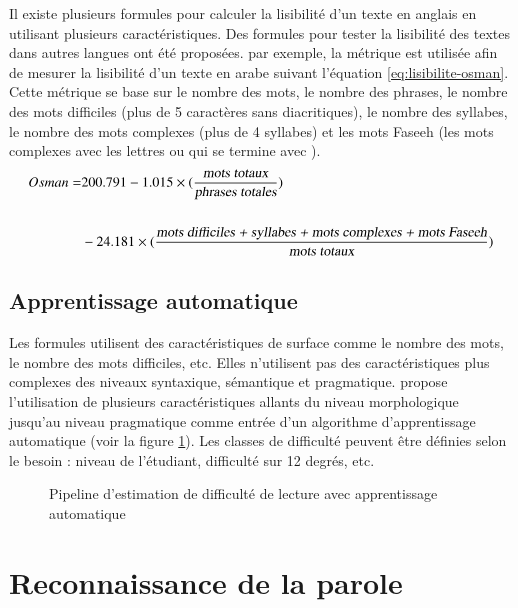 \documentclass{KodeBook}
\begin{document}
Il existe plusieurs formules pour calculer la lisibilité d'un texte en anglais en utilisant plusieurs caractéristiques. 
Des formules pour tester la lisibilité des textes dans autres langues ont été proposées. 
par exemple, la métrique  \cite{2016-elhaj-rayson} est utilisée afin de mesurer la lisibilité d'un texte en arabe suivant l'équation \ref{eq:lisibilite-osman}.
Cette métrique se base sur le nombre des mots, le nombre des phrases, le nombre des mots difficiles (plus de 5 caractères sans diacritiques), le nombre des syllabes, le nombre des mots complexes (plus de 4 syllabes) et les mots Faseeh (les mots complexes avec les lettres  ou qui se termine avec ).
\begin{align}
Osman = & 200.791 - 1.015 \times (\frac{\text{\slshape mots totaux}}{\text{\slshape phrases totales}}) \nonumber\\
& \nonumber\\
& - 24.181 \times (\frac{\text{\slshape mots difficiles + syllabes + mots complexes + mots Faseeh}}{\text{\slshape mots totaux}}) \label{eq:lisibilite-osman}
\end{align}


\subsection{Apprentissage automatique}

Les formules utilisent des caractéristiques de surface comme le nombre des mots, le nombre des mots difficiles, etc.
Elles n'utilisent pas des caractéristiques plus complexes des niveaux syntaxique, sémantique et pragmatique. 
\citet{2014-collins} propose l'utilisation de plusieurs caractéristiques allants du niveau morphologique jusqu'au niveau pragmatique comme entrée d'un algorithme d'apprentissage automatique (voir la figure \ref{fig:lisibilite-collins}).
Les classes de difficulté peuvent être définies selon le besoin : niveau de l'étudiant, difficulté sur 12 degrés, etc.

\begin{figure}[!ht]
	\centering
	\caption{Pipeline d'estimation de difficulté de lecture avec apprentissage automatique \cite{2014-collins}}
	\label{fig:lisibilite-collins}
\end{figure}


\section{Reconnaissance de la parole}
\end{document}
